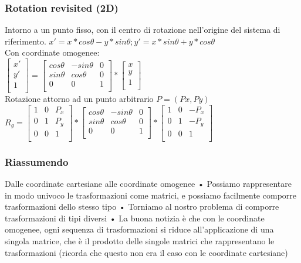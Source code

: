 \subsubsection{Rotation revisited (2D)}
Intorno a un punto fisso, con il centro di rotazione nell'origine del sistema di riferimento.
$x'=x*cos\theta-y*sin \theta; y'=x*sin \theta + y*cos\theta$ \\
Con coordinate omogenee:
\\
$\begin{bmatrix}
    x' \\
    y' \\
    1 \\
\end{bmatrix}
=
\begin{bmatrix}
cos \theta & -sin \theta & 0 \\
sin \theta & cos \theta & 0 \\
0 & 0 & 1 \\
\end{bmatrix}
*
\begin{bmatrix}
    x \\
    y \\
    1 \\
\end{bmatrix}
$
\\
Rotazione attorno ad un punto arbitrario $P = (Px,Py)$ \\
$R_g=
    \begin{bmatrix}
    1 & 0 & P_x \\
    0 & 1 & P_y \\
    0 & 0 & 1 \\
    \end{bmatrix}
    *
    \begin{bmatrix}
        cos \theta & -sin \theta & 0 \\
        sin \theta & cos \theta & 0 \\
        0 & 0 & 1 \\
    \end{bmatrix}
    *
    \begin{bmatrix}
        1 & 0 & -P_x \\
        0 & 1 & -P_y \\
        0 & 0 & 1 \\
    \end{bmatrix} $
\subsubsection{Riassumendo}
Dalle coordinate cartesiane alle coordinate omogenee
• Possiamo rappresentare in modo univoco le trasformazioni come matrici, e possiamo facilmente comporre trasformazioni dello stesso tipo
• Torniamo al nostro problema di comporre trasformazioni di tipi diversi
• La buona notizia è che con le coordinate omogenee, ogni sequenza di trasformazioni si riduce all'applicazione di una singola matrice, che è il prodotto delle singole matrici che rappresentano le trasformazioni (ricorda che questo non era il caso con le coordinate cartesiane)
